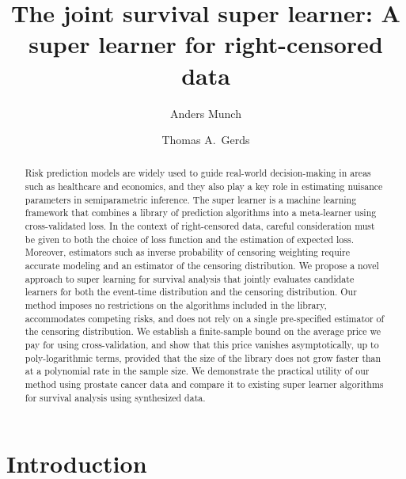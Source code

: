 \documentclass[alpha-refs]{wiley-article}
\title{The joint survival super learner: A super learner for right-censored
  data}
\author[1]{Anders Munch}
\author[1]{Thomas A.~Gerds}
\affil[1]{Section of Biostatistics, University of Copenhagen}
\newcommand{\1}{\mathbb{1}}
\begin{document}
\maketitle

\begin{abstract}
  Risk prediction models are widely used to guide
  real-world decision-making in areas such as healthcare and
  economics, and they also play a key role in estimating nuisance
  parameters in semiparametric inference. The super learner is a
  machine learning framework that combines a library of prediction
  algorithms into a meta-learner using cross-validated loss. In the
  context of right-censored data, careful consideration must be given
  to both the choice of loss function and the estimation of expected
  loss.  Moreover, estimators such as inverse probability of censoring
  weighting require accurate modeling and an estimator of the
  censoring distribution. We propose a novel approach to super
  learning for survival analysis that jointly evaluates candidate
  learners for both the event-time distribution and the censoring
  distribution. Our method imposes no restrictions on the algorithms
  included in the library, accommodates competing risks, and does not
  rely on a single pre-specified estimator of the censoring
  distribution. We establish a finite-sample bound on the average
  price we pay for using cross-validation, and show that this price
  vanishes asymptotically, up to poly-logarithmic terms, provided that
  the size of the library does not grow faster than at a polynomial
  rate in the sample size. We demonstrate the practical utility of our
  method using prostate cancer data and compare it to existing super
  learner algorithms for survival analysis using synthesized data.

\end{abstract}


\section{Introduction}
\label{sec:introduction}
\end{document}

